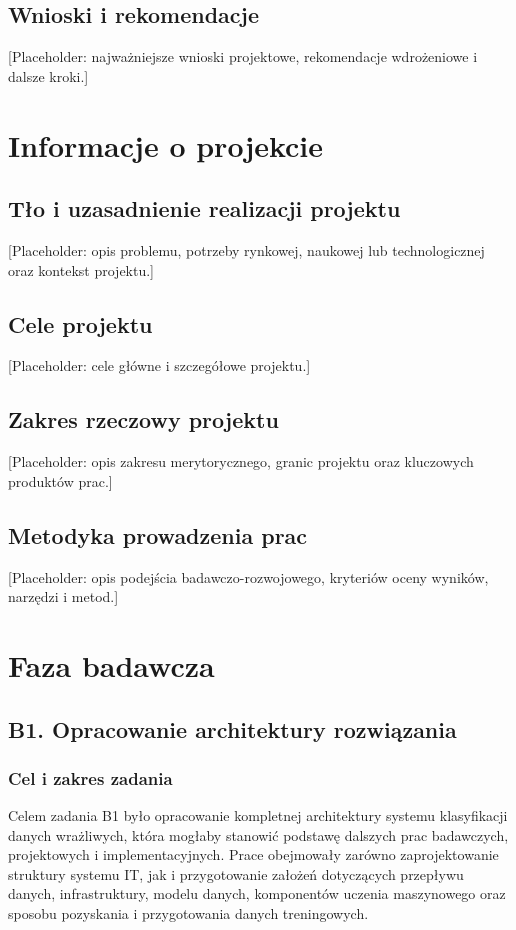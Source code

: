 \documentclass[12pt,a4paper]{report}
\begin{document}
\section{Wnioski i rekomendacje}
[Placeholder: najważniejsze wnioski projektowe, rekomendacje wdrożeniowe i dalsze kroki.]

\chapter{Informacje o projekcie}
\section{Tło i uzasadnienie realizacji projektu}
[Placeholder: opis problemu, potrzeby rynkowej, naukowej lub technologicznej oraz kontekst projektu.]

\section{Cele projektu}
[Placeholder: cele główne i szczegółowe projektu.]

\section{Zakres rzeczowy projektu}
[Placeholder: opis zakresu merytorycznego, granic projektu oraz kluczowych produktów prac.]

\section{Metodyka prowadzenia prac}
[Placeholder: opis podejścia badawczo-rozwojowego, kryteriów oceny wyników, narzędzi i metod.]




\chapter{Faza badawcza}



\section{B1. Opracowanie architektury rozwiązania}
\subsection{Cel i zakres zadania}
Celem zadania B1 było opracowanie kompletnej architektury systemu klasyfikacji danych wrażliwych, która mogłaby stanowić podstawę dalszych prac badawczych, projektowych i implementacyjnych. Prace obejmowały zarówno zaprojektowanie struktury systemu IT, jak i przygotowanie założeń dotyczących przepływu danych, infrastruktury, modelu danych, komponentów uczenia maszynowego oraz sposobu pozyskania i przygotowania danych treningowych.
\end{document}
